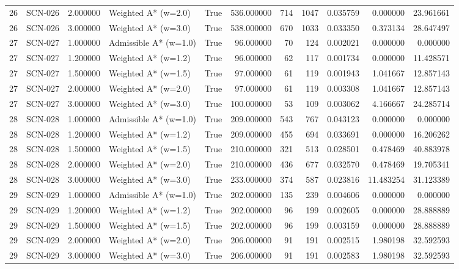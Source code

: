 \begin{table}[htbp]
\begin{tabular}{rlrlrrrrrrr}
26 & SCN-026 & 2.000000 & Weighted A* (w=2.0) & True & 536.000000 & 714 & 1047 & 0.035759 & 0.000000 & 23.961661 \\
26 & SCN-026 & 3.000000 & Weighted A* (w=3.0) & True & 538.000000 & 670 & 1033 & 0.033350 & 0.373134 & 28.647497 \\
27 & SCN-027 & 1.000000 & Admissible A* (w=1.0) & True & 96.000000 & 70 & 124 & 0.002021 & 0.000000 & 0.000000 \\
27 & SCN-027 & 1.200000 & Weighted A* (w=1.2) & True & 96.000000 & 62 & 117 & 0.001734 & 0.000000 & 11.428571 \\
27 & SCN-027 & 1.500000 & Weighted A* (w=1.5) & True & 97.000000 & 61 & 119 & 0.001943 & 1.041667 & 12.857143 \\
27 & SCN-027 & 2.000000 & Weighted A* (w=2.0) & True & 97.000000 & 61 & 119 & 0.003308 & 1.041667 & 12.857143 \\
27 & SCN-027 & 3.000000 & Weighted A* (w=3.0) & True & 100.000000 & 53 & 109 & 0.003062 & 4.166667 & 24.285714 \\
28 & SCN-028 & 1.000000 & Admissible A* (w=1.0) & True & 209.000000 & 543 & 767 & 0.043123 & 0.000000 & 0.000000 \\
28 & SCN-028 & 1.200000 & Weighted A* (w=1.2) & True & 209.000000 & 455 & 694 & 0.033691 & 0.000000 & 16.206262 \\
28 & SCN-028 & 1.500000 & Weighted A* (w=1.5) & True & 210.000000 & 321 & 513 & 0.028501 & 0.478469 & 40.883978 \\
28 & SCN-028 & 2.000000 & Weighted A* (w=2.0) & True & 210.000000 & 436 & 677 & 0.032570 & 0.478469 & 19.705341 \\
28 & SCN-028 & 3.000000 & Weighted A* (w=3.0) & True & 233.000000 & 374 & 587 & 0.023816 & 11.483254 & 31.123389 \\
29 & SCN-029 & 1.000000 & Admissible A* (w=1.0) & True & 202.000000 & 135 & 239 & 0.004606 & 0.000000 & 0.000000 \\
29 & SCN-029 & 1.200000 & Weighted A* (w=1.2) & True & 202.000000 & 96 & 199 & 0.002605 & 0.000000 & 28.888889 \\
29 & SCN-029 & 1.500000 & Weighted A* (w=1.5) & True & 202.000000 & 96 & 199 & 0.003159 & 0.000000 & 28.888889 \\
29 & SCN-029 & 2.000000 & Weighted A* (w=2.0) & True & 206.000000 & 91 & 191 & 0.002515 & 1.980198 & 32.592593 \\
29 & SCN-029 & 3.000000 & Weighted A* (w=3.0) & True & 206.000000 & 91 & 191 & 0.002583 & 1.980198 & 32.592593 \\
\bottomrule
\end{tabular}

\end{table}
